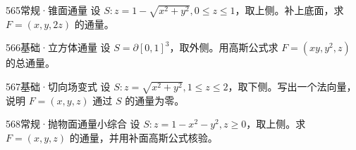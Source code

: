 \begin{exercise}{565}{常规·锥面通量}
设 $S:z=1-\sqrt{x^2+y^2},0\leq z\leq1$，取上侧。补上底面，求 $F=(x,y,2z)$ 的通量。
\end{exercise}
\begin{exercise}{566}{基础·立方体通量}
设 $S=\partial[0,1]^3$，取外侧。用高斯公式求 $F=(xy,y^2,z)$ 的总通量。
\end{exercise}
\begin{exercise}{567}{基础·切向场变式}
设 $S:z=\sqrt{x^2+y^2},1\leq z\leq2$，取下侧。写出一个法向量，说明 $F=(x,y,z)$ 通过 $S$ 的通量为零。
\end{exercise}
\begin{exercise}{568}{常规·抛物面通量小综合}
设 $S:z=1-x^2-y^2,z\geq0$，取上侧。求 $F=(x,y,z)$ 的通量，并用补面高斯公式核验。
\end{exercise}
